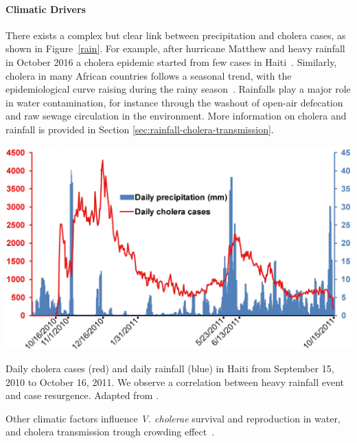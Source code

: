 \paragraph{Climatic Drivers} There exists a complex but clear link between precipitation and cholera cases, as shown in Figure~\ref{rain}. For example, after hurricane Matthew and heavy rainfall in October 2016 a cholera epidemic started from few cases in Haiti~\cite{rinaldo_reassessment_2012, gaudart_spatio-temporal_2013}. Similarly, cholera in many African countries follows a seasonal trend, with the epidemiological curve raising during the rainy season~\cite{baracchini_seasonality_2017, pascual_cholera_2000}.  Rainfalls play a major role in water contamination, for instance through the washout of open-air defecation and raw sewage circulation in the environment. More information on cholera and rainfall is provided in Section \ref{sec:rainfall-cholera-transmission}.

\begin{marginfigure}
\centering
\includegraphics[width=\textwidth]{fig/cholera-rainfall.png}
\caption[Daily cholera cases and rainfall in Haiti]{Daily cholera cases (red) and daily rainfall (blue) in Haiti from September 15, 2010 to October
16, 2011. We observe a correlation between heavy rainfall event and case resurgence. Adapted from .}
\label{rain}
\end{marginfigure}

Other climatic factors influence \textit{V. cholerae} survival and reproduction in water, and cholera transmission trough crowding effect~\cite{koelle_refractory_2005}.

